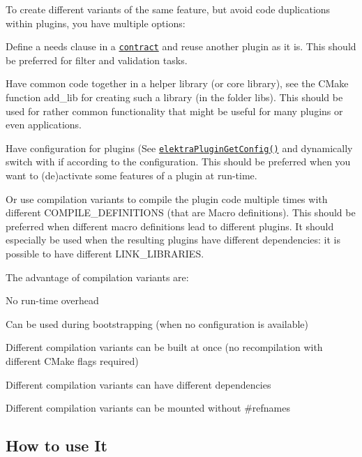 To create different variants of the same feature, but avoid code duplications within plugins, you have multiple options\+:


\begin{DoxyItemize}
\item Define a needs clause in a \href{/home/markus/Projekte/Elektra/current/doc/CONTRACT.ini}{\tt contract} and reuse another plugin as it is. This should be preferred for filter and validation tasks.
\item Have common code together in a helper library (or core library), see the C\+Make function {\ttfamily add\+\_\+lib} for creating such a library (in the folder libs). This should be used for rather common functionality that might be useful for many plugins or even applications.
\item Have configuration for plugins (See \href{https://doc.libelektra.org/api/latest/html/group__plugin.html}{\tt elektra\+Plugin\+Get\+Config()} and dynamically switch with {\ttfamily if} according to the configuration. This should be preferred when you want to (de)activate some features of a plugin at run-\/time.
\item Or use compilation variants to compile the plugin code multiple times with different {\ttfamily C\+O\+M\+P\+I\+L\+E\+\_\+\+D\+E\+F\+I\+N\+I\+T\+I\+O\+NS} (that are Macro definitions). This should be preferred when different macro definitions lead to different plugins. It should especially be used when the resulting plugins have different dependencies\+: it is possible to have different {\ttfamily L\+I\+N\+K\+\_\+\+L\+I\+B\+R\+A\+R\+I\+ES}.
\end{DoxyItemize}

The advantage of compilation variants are\+:


\begin{DoxyItemize}
\item No run-\/time overhead
\item Can be used during bootstrapping (when no configuration is available)
\item Different compilation variants can be built at once (no recompilation with different C\+Make flags required)
\item Different compilation variants can have different dependencies
\item Different compilation variants can be mounted without {\ttfamily \#refnames}
\end{DoxyItemize}

\subsection*{How to use It}


